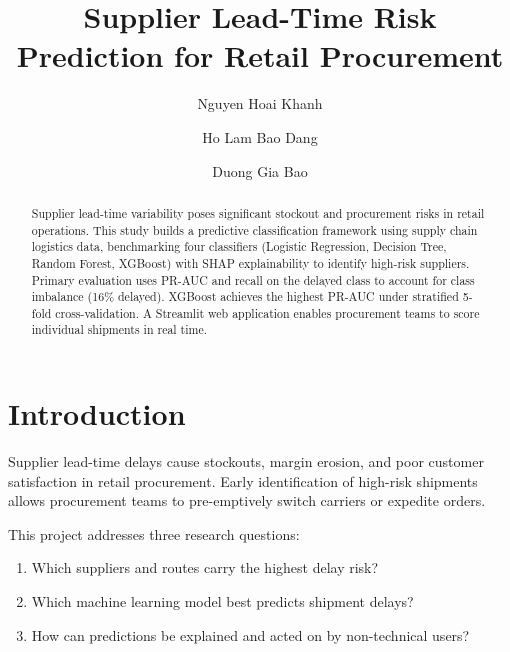 \documentclass[runningheads]{llncs}
\begin{document}
\title{Supplier Lead-Time Risk Prediction for Retail Procurement}

\author{Nguyen Hoai Khanh \and
Ho Lam Bao Dang \and
Duong Gia Bao}



\maketitle

\begin{abstract}
Supplier lead-time variability poses significant stockout and procurement risks in
retail operations. This study builds a predictive classification framework using
supply chain logistics data, benchmarking four classifiers (Logistic Regression,
Decision Tree, Random Forest, XGBoost) with SHAP explainability to identify
high-risk suppliers. Primary evaluation uses PR-AUC and recall on the delayed
class to account for class imbalance (16\% delayed). XGBoost achieves the highest
PR-AUC under stratified 5-fold cross-validation. A Streamlit web application
enables procurement teams to score individual shipments in real time.

\end{abstract}


\section{Introduction}

Supplier lead-time delays cause stockouts, margin erosion, and poor customer
satisfaction in retail procurement. Early identification of high-risk shipments
allows procurement teams to pre-emptively switch carriers or expedite orders.

This project addresses three research questions:
\begin{enumerate}
  \item Which suppliers and routes carry the highest delay risk?
  \item Which machine learning model best predicts shipment delays?
  \item How can predictions be explained and acted on by non-technical users?
\end{enumerate}
\end{document}
